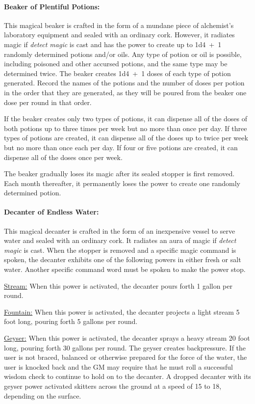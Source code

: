 \begin{multicols}{2}

\paragraph{Beaker of Plentiful Potions:} This magical beaker is crafted in the form of a mundane piece of alchemist's laboratory equipment and sealed with an ordinary cork.  However, it radiates magic if \textit{detect magic} is cast and has the power to create up to 1d4~+~1 randomly determined potions and/or oils.  Any type of potion or oil is possible, including poisoned and other accursed potions, and the same type may be determined twice.  The beaker creates 1d4~+~1 doses of each type of potion generated.  Record the names of the potions and the number of doses per potion in the order that they are generated, as they will be poured from the beaker one dose per round in that order. 

If the beaker creates only two types of potions, it can dispense all of the doses of both potions up to three times per week but no more than once per day.  If three types of potions are created, it can dispense all of the doses up to twice per week but no more than once each per day.  If four or five potions are created, it can dispense all of the doses once per week.  

The beaker gradually loses its magic after its sealed stopper is first removed.  Each month thereafter, it permanently loses the power to create one randomly determined potion.  

\paragraph{Decanter of Endless Water:} This magical decanter is crafted in the form of an inexpensive vessel to serve water and sealed with an ordinary cork.  It radiates an aura of magic if \textit{detect magic} is cast.  When the stopper is removed and a specific magic command is spoken, the decanter exhibits one of the following powers in either fresh or salt water.  Another specific command word must be spoken to make the power stop.

\underline{Stream:} When this power is activated, the decanter pours forth 1 gallon per round.

\underline{Fountain:} When this power is activated, the decanter projects a light stream 5 foot long, pouring forth 5 gallons per round.

\underline{Geyser:} When this power is activated, the decanter sprays a heavy stream 20 foot long, pouring forth 30 gallons per round.  The geyser creates backpressure.  If the user is not braced, balanced or otherwise prepared for the force of the water, the user is knocked back and the GM may require that he must roll a successful wisdom check to continue to hold on to the decanter.  A dropped decanter with its geyser power activated skitters across the ground at a speed of 15 to 18, depending on the surface.


\end{multicols}
